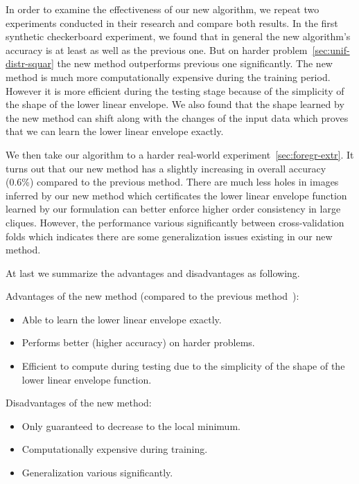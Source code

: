 In order to examine the effectiveness of our new algorithm, we
repeat two experiments  conducted in
their research and compare both results. In the first synthetic
checkerboard experiment, we found that in general the new
algorithm's accuracy is at least as well as the previous one. But
on harder problem~\ref{sec:unif-distr-squar} the new method
outperforms previous one significantly. The new method is much
more computationally expensive during the training period.
However it is more efficient during the testing stage because of
the simplicity of the shape of the lower linear envelope. We also
found that the shape learned by the new method can shift along
with the changes of the input data which proves that we can learn
the lower linear envelope exactly.

We then take our algorithm to a harder real-world
experiment~\ref{sec:foregr-extr}. It turns out that our new
method has a slightly increasing in overall accuracy (0.6\%)
compared to the previous method. There are much less holes in
images inferred by our new method which certificates the lower
linear envelope function learned by our formulation can better
enforce higher order consistency in large cliques. However, the
performance various significantly between cross-validation folds
which indicates there are some generalization issues existing in
our new method.

At last we summarize the advantages and disadvantages as
following.

\bigskip

Advantages of the new method (compared to the previous
method~\cite{gouldlearning,Gould:ICML2011}):

\begin{itemize}
\item Able to learn the lower linear envelope exactly.
\item Performs better (higher accuracy) on harder problems.
\item Efficient to compute during testing due to the simplicity
  of the shape of the lower linear envelope function.
\end{itemize}

Disadvantages of the new method:

\begin{itemize}
\item Only guaranteed to decrease to the local minimum.
\item Computationally expensive during training.
\item Generalization various significantly.
\end{itemize}




